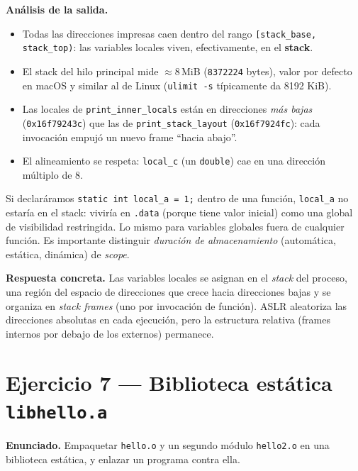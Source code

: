 \documentclass[11pt,a4paper]{article}
\begin{document}
\textbf{Análisis de la salida.}

\begin{itemize}[leftmargin=*]
    \item Todas las direcciones impresas caen dentro del rango
        \texttt{[stack\_base, stack\_top)}: las variables locales
        viven, efectivamente, en el \textbf{stack}.
    \item El stack del hilo principal mide $\approx 8$\,MiB
        (\texttt{8372224} bytes), valor por defecto en macOS y similar
        al de Linux (\texttt{ulimit -s} típicamente da 8192 KiB).
    \item Las locales de \texttt{print\_inner\_locals} están en
        direcciones \emph{más bajas} (\texttt{0x16f79243c}) que las de
        \texttt{print\_stack\_layout} (\texttt{0x16f7924fc}): cada
        invocación empujó un nuevo frame ``hacia abajo''.
    \item El alineamiento se respeta: \texttt{local\_c} (un
        \texttt{double}) cae en una dirección múltiplo de 8.
\end{itemize}

\begin{ojo}
Si declaráramos \texttt{static int local\_a = 1;} dentro de una
función, \texttt{local\_a} no estaría en el stack: viviría en
\texttt{.data} (porque tiene valor inicial) como una global de visibilidad
restringida. Lo mismo para variables globales fuera de cualquier
función. Es importante distinguir \emph{duración de almacenamiento}
(automática, estática, dinámica) de \emph{scope}.
\end{ojo}

\textbf{Respuesta concreta.} Las variables locales se asignan en el
\emph{stack} del proceso, una región del espacio de direcciones que
crece hacia direcciones bajas y se organiza en \emph{stack frames}
(uno por invocación de función). ASLR aleatoriza las direcciones
absolutas en cada ejecución, pero la estructura relativa (frames
internos por debajo de los externos) permanece.

\section{Ejercicio 7 --- Biblioteca estática \texttt{libhello.a}}

\textbf{Enunciado.} Empaquetar \texttt{hello.o} y un segundo módulo
\texttt{hello2.o} en una biblioteca estática, y enlazar un programa
contra ella.
\end{document}
